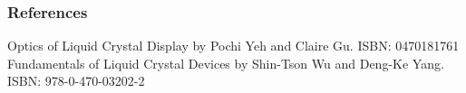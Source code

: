 \documentclass{beamer}
\begin{document}
\begin{frame}
\frametitle{References}
\begin{thebibliography}{0}
 Optics of Liquid Crystal Display by Pochi Yeh and Claire Gu. ISBN: 0470181761
 Fundamentals of Liquid Crystal Devices by Shin-Tson Wu and Deng-Ke Yang. ISBN: 978-0-470-03202-2
\end{thebibliography}
\end{frame}
\end{document}
